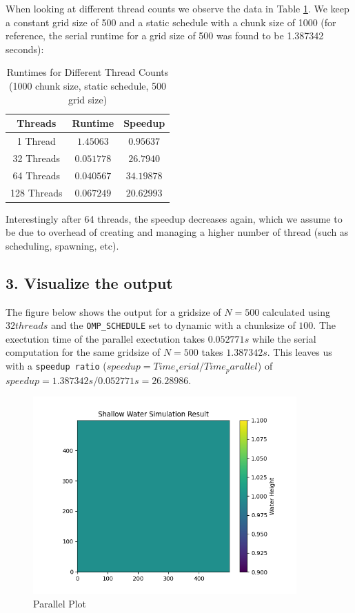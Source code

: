 \documentclass[a4paper,10pt]{article}
\begin{document}
When looking at different thread counts we observe the data in Table \ref{table:ex5_thread_changes}. We keep a constant grid size of 500 and a static schedule with a chunk size of 1000 (for reference, the serial runtime for a grid size of 500 was found to be 1.387342 seconds):
\begin{table}[h!]
\centering
\begin{tabular}{|c|c|c|}
\hline
\textbf{Threads} & \textbf{Runtime} & \textbf{Speedup} \\
\hline
1 Thread  & $1.45063$  & $0.95637$ \\
32 Threads & $0.051778$ & $26.7940$ \\
64 Threads & $0.040567$ & $34.19878$ \\
128 Threads & $0.067249$ & $20.62993$ \\
\hline
\end{tabular}
\caption{Runtimes for Different Thread Counts (1000 chunk size, static schedule, 500 grid size)}
\label{table:ex5_thread_changes}
\end{table}

Interestingly after 64 threads, the speedup decreases again, which we assume to be due to overhead of creating and managing a higher number of thread (such as scheduling, spawning, etc).

\subsection{3. Visualize the output}
The figure below shows the output for a gridsize of $N=500$ calculated using $32 threads$ and the \verb|OMP_SCHEDULE| set to dynamic with a 
chunksize of $ 100 $.
The exectution time of the parallel exectution takes $0.052771s$ while the serial computation for the same gridsize of $N=500$ takes $1.387342s$.  
This leaves us with a \verb|speedup ratio| ($speedup = Time_serial / Time_parallel$) of $speedup = 1.387342s/0.052771s = 26.28986 $. 


\begin{figure}[H]
  \centering
  \includegraphics[width=0.9\textwidth]{img/ex5/parallel_plot.png}
  \caption{Parallel Plot}
  \label{fig:ex5_parallel}
\end{figure}
\end{document}
